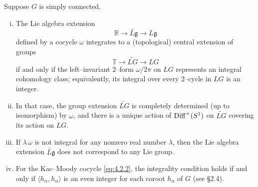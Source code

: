 \documentclass[12pt]{article}
\begin{document}
\begin{theorem}\label{thm:PS-4.4.1}
    Suppose $G$ is simply connected.
    \begin{enumerate}[(i)]
        \item The Lie algebra extension
              \[
                  \mathbb{R} \longrightarrow \widetilde{L\mathfrak g} \longrightarrow L\mathfrak g
              \]
              defined by a cocycle $\omega$ integrates to a (topological) central extension of groups
              \[
                  \mathbb{T} \longrightarrow \widetilde{LG} \longrightarrow LG
              \]
              if and only if the left–invariant $2$–form $\omega/2\pi$ on $LG$ represents an integral cohomology class; equivalently, its integral over every $2$–cycle in $LG$ is an integer.

        \item In that case, the group extension $\widetilde{LG}$ is completely determined (up to isomorphism) by $\omega$, and there is a unique action of $\operatorname{Diff}^+(S^1)$ on $\widetilde{LG}$ covering its action on $LG$.

        \item If $\lambda\,\omega$ is not integral for any nonzero real number $\lambda$, then the Lie algebra extension $\widetilde{L\mathfrak g}$ does not correspond to any Lie group.

        \item For the Kac–Moody cocycle \eqref{eq:4.2.2}, the integrality condition holds if and only if $\langle h_\alpha, h_\alpha\rangle$ is an even integer for each coroot $h_\alpha$ of $G$ (see §2.4).
    \end{enumerate}
\end{theorem}
\end{document}
